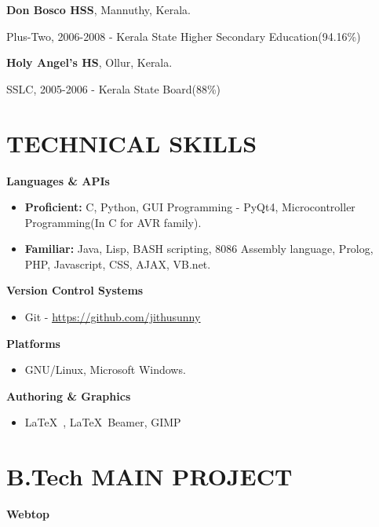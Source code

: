 \begin{resume}
{\bf \textsf{Don Bosco HSS}}, Mannuthy, Kerala.\\
\vspace*{-.1in}
\begin{list1}
\item[] Plus-Two, 2006-2008 - Kerala State Higher Secondary Education\qquad \qquad(94.16\%)
\end{list1}

{\bf \textsf{Holy Angel's HS}}, Ollur, Kerala.\\
\vspace*{-.1in}
\begin{list1}
\item[] SSLC, 2005-2006 - Kerala State Board\qquad \qquad \qquad(88\%)
\end{list1}

\vspace*{+3.5mm}
 \section{\sc \bf \textsf{TECHNICAL SKILLS}}
\textbf{Languages \& APIs}
\begin{itemize}
\item \textbf{Proficient:} C, Python, GUI Programming - PyQt4, Microcontroller Programming(In C for AVR family).
\item \textbf{Familiar:} Java, Lisp, BASH scripting, 8086 Assembly language, Prolog, PHP, Javascript, CSS, AJAX, VB.net.
\end{itemize}

\textbf{Version Control Systems}
\begin{itemize}
\item Git - \href{https://github.com/jithusunny}{\underline{https://github.com/jithusunny}}
\end{itemize}

\textbf{Platforms}
\begin{itemize}
\item GNU/Linux, Microsoft Windows.
\end{itemize}

\textbf{Authoring \& Graphics}
\begin{itemize}
\item \LaTeX\ , \LaTeX\ Beamer, GIMP
\end{itemize}

\vspace*{+2mm} 

\section{\sc \bf \textsf{B.Tech MAIN PROJECT}}
{\bf \textsf{Webtop}}\\
\vspace*{-.1in}


\end{resume}
